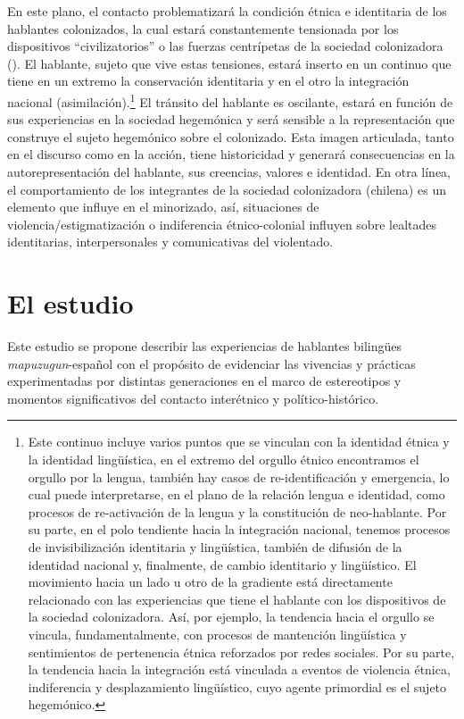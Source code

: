 \documentclass[output=paper]{../langscibook}
\begin{document}
En este plano, el contacto problematizará la condición étnica e identitaria de los hablantes colonizados, la cual estará constantemente tensionada por los dispositivos “civilizatorios” o las fuerzas centrípetas de la sociedad colonizadora (\citealt{NahuelpánMoreno2012}). El hablante, sujeto que vive estas tensiones, estará inserto en un continuo que tiene en un extremo la conservación identitaria y en el otro la integración nacional (asimilación).\footnote{Este continuo incluye varios puntos que se vinculan con la identidad étnica y la identidad lingüística, en el extremo del orgullo étnico encontramos el orgullo por la lengua, también hay casos de re-identificación y emergencia, lo cual puede interpretarse, en el plano de la relación lengua e identidad, como procesos de re-activación de la lengua y la constitución de neo-hablante. Por su parte, en el polo tendiente hacia la integración nacional, tenemos procesos de invisibilización identitaria y lingüística, también de difusión de la identidad nacional y, finalmente, de cambio identitario y lingüístico. El movimiento hacia un lado u otro de la gradiente está directamente relacionado con las experiencias que tiene el hablante con los dispositivos de la sociedad colonizadora. Así, por ejemplo, la tendencia hacia el orgullo se vincula, fundamentalmente, con procesos de mantención lingüística y sentimientos de pertenencia étnica reforzados por redes sociales. Por su parte, la tendencia hacia la integración está vinculada a eventos de violencia étnica, indiferencia y desplazamiento lingüístico, cuyo agente primordial es el sujeto hegemónico.} El tránsito del hablante es oscilante, estará en función de sus experiencias en la sociedad hegemónica y será sensible a la representación que construye el sujeto hegemónico sobre el colonizado. Esta imagen articulada, tanto en el discurso como en la acción, tiene historicidad y generará consecuencias en la autorepresentación del hablante, sus creencias, valores e identidad. En otra línea, el comportamiento de los integrantes de la sociedad colonizadora (chilena) es un elemento que influye en el minorizado, así, situaciones de violencia/estigmatización o indiferencia étnico-colonial influyen sobre lealtades identitarias, interpersonales y comunicativas del violentado.


\section{El estudio}\label{sec:olate:4}


Este estudio se propone describir las experiencias de hablantes bilingües \textit{mapuzugun}{}-español con el propósito de evidenciar las vivencias y prácticas experimentadas por distintas generaciones en el marco de estereotipos y momentos significativos del contacto interétnico y político-histórico.
\end{document}
